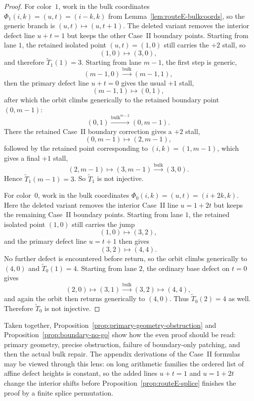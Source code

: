 \documentclass[11pt]{article}
\newcommand{\bulk}{\mathrm{bulk}}   %
\begin{document}
\begin{proof}
For color~$1$, work in the bulk coordinates $\Phi_1(i,k)=(u,t)=(i-k,k)$ from Lemma~\ref{lem:routeE-bulkcoords}, so the generic branch is $(u,t)\mapsto(u,t+1)$.
The deleted variant removes the interior defect line $u+t=1$ but keeps the other Case~II boundary points.
Starting from lane $1$, the retained isolated point $(u,t)=(1,0)$ still carries the $+2$ stall, so
\[
(1,0)\longmapsto(3,0),
\]
and therefore $\widetilde T_1(1)=3$.
Starting from lane $m-1$, the first step is generic,
\[
(m-1,0)\xrightarrow{\bulk}(m-1,1),
\]
then the primary defect line $u+t=0$ gives the usual $+1$ stall,
\[
(m-1,1)\longmapsto(0,1),
\]
after which the orbit climbs generically to the retained boundary point $(0,m-1)$:
\[
(0,1)\xrightarrow{\bulk^{m-2}}(0,m-1).
\]
There the retained Case~II boundary correction gives a $+2$ stall,
\[
(0,m-1)\longmapsto(2,m-1),
\]
followed by the retained point corresponding to $(i,k)=(1,m-1)$, which gives a final $+1$ stall,
\[
(2,m-1)\longmapsto(3,m-1)\xrightarrow{\bulk}(3,0).
\]
Hence $\widetilde T_1(m-1)=3$.
So $\widetilde T_1$ is not injective.

For color~$0$, work in the bulk coordinates $\Phi_0(i,k)=(u,t)=(i+2k,k)$.
Here the deleted variant removes the interior Case~II line $u=1+2t$ but keeps the remaining Case~II boundary points.
Starting from lane $1$, the retained isolated point $(1,0)$ still carries the jump
\[
(1,0)\longmapsto(3,2),
\]
and the primary defect line $u=t+1$ then gives
\[
(3,2)\longmapsto(4,4).
\]
No further defect is encountered before return, so the orbit climbs generically to $(4,0)$ and $\widetilde T_0(1)=4$.
Starting from lane $2$, the ordinary base defect on $t=0$ gives
\[
(2,0)\longmapsto(3,1)\xrightarrow{\bulk}(3,2)\longmapsto(4,4),
\]
and again the orbit then returns generically to $(4,0)$.
Thus $\widetilde T_0(2)=4$ as well.
Therefore $\widetilde T_0$ is not injective.
\end{proof}

Taken together, Proposition~\ref{prop:primary-geometry-obstruction} and Proposition~\ref{prop:boundary-no-go} show how the even proof should be read: primary geometry, precise obstruction, failure of boundary-only patching, and then the actual bulk repair.
The appendix derivations of the Case~II formulas may be viewed through this lens: on long arithmetic families the ordered list of affine defect heights is constant, so the added lines $u+t=1$ and $u=1+2t$ change the interior shifts before Proposition~\ref{prop:routeE-splice} finishes the proof by a finite splice permutation.
\end{document}
